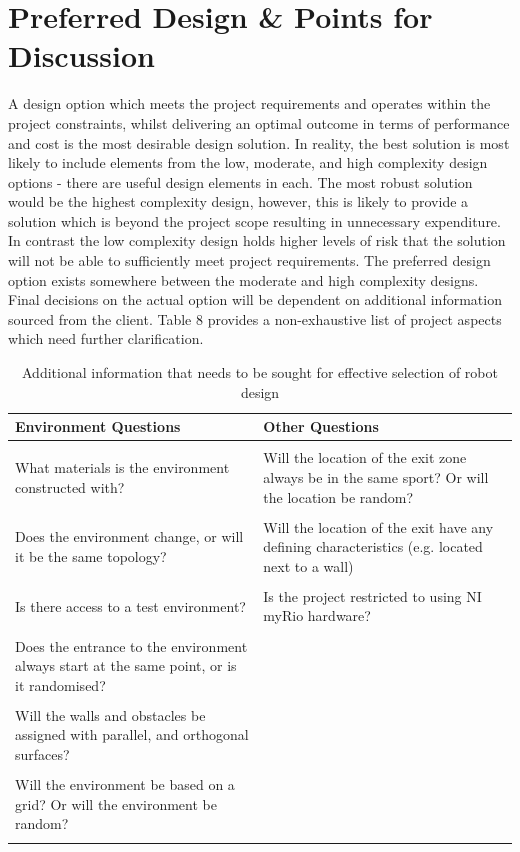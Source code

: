 \documentclass[a4paper]{article}
\begin{document}
\section{Preferred Design \& Points for Discussion}
A design option which meets the project requirements and operates within the project constraints, whilst delivering an optimal outcome in terms of performance and cost is the most desirable design solution. In reality, the best solution is most likely to include elements from the low, moderate, and high complexity design options - there are useful design elements in each. The most robust solution would be the highest complexity design, however, this is likely to provide a solution which is beyond the project scope resulting in unnecessary expenditure. In contrast the low complexity design holds higher levels of risk that the solution will not be able to sufficiently meet project requirements. The preferred design option exists somewhere between the moderate and high complexity designs. Final decisions on the actual option will be dependent on additional information sourced from the client. Table 8 provides a non-exhaustive list of project aspects which need further clarification.
\begin{table}[h]
\centering
\caption{Additional information that needs to be sought for effective selection of robot design}
\begin{tabular}{p{8cm}p{8cm}}
\toprule
\textbf{Environment Questions} & \textbf{Other Questions}\\
\midrule
 & \\
What materials is the environment constructed with? & Will the location of the exit zone always be in the same sport? Or will the location be random?\\
 & \\
Does the environment change, or will it be the same topology? & Will the location of the exit have any defining characteristics (e.g. located next to a wall) \\
 & \\
Is there access to a test environment? & Is the project restricted to using NI myRio hardware?\\
 & \\
Does the entrance to the environment always start at the same point, or is it randomised? & \\
 & \\
Will the walls and obstacles be assigned with parallel, and orthogonal surfaces? & \\
 & \\
Will the environment be based on a grid? Or will the environment be random? & \\
 & \\
\bottomrule
\end{tabular}
\end{table}
\end{document}
